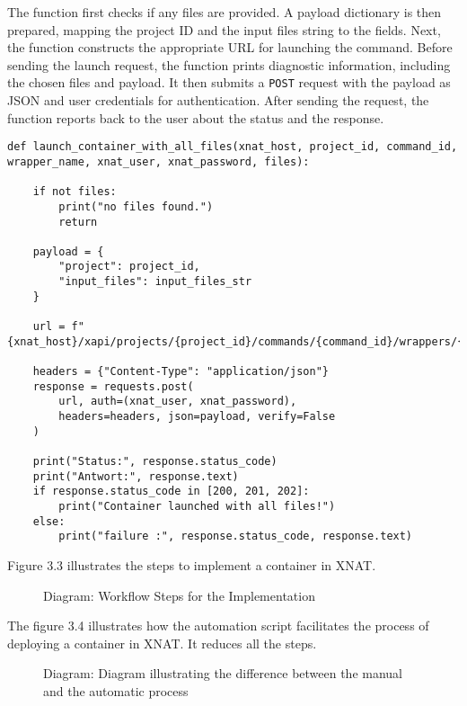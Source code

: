 The function first checks if any files are provided. A payload dictionary is then prepared, mapping the project ID and the input files string to the fields. Next, the function constructs the appropriate URL for launching the command. Before sending the launch request, the function prints diagnostic information, including the chosen files and payload. It then submits a \texttt{POST} request with the payload as JSON and user credentials for authentication. After sending the request, the function reports back to the user about the status and the response.

\begin{lstlisting}
def launch_container_with_all_files(xnat_host, project_id, command_id, wrapper_name, xnat_user, xnat_password, files):
   
    if not files:
        print("no files found.")
        return 

    payload = {
        "project": project_id,
        "input_files": input_files_str
    }

    url = f"{xnat_host}/xapi/projects/{project_id}/commands/{command_id}/wrappers/{wrapper_name}/root/project/launch"

    headers = {"Content-Type": "application/json"}
    response = requests.post(
        url, auth=(xnat_user, xnat_password),
        headers=headers, json=payload, verify=False
    )

    print("Status:", response.status_code)
    print("Antwort:", response.text)
    if response.status_code in [200, 201, 202]:
        print("Container launched with all files!")
    else:
        print("failure :", response.status_code, response.text)
\end{lstlisting}
Figure 3.3 illustrates the steps to implement a container in XNAT.


\begin{figure}[ht]
    \centering
    \def\svgwidth{0.9\linewidth}
    
    \caption{Diagram: Workflow Steps for the Implementation}
    \label{fig:workflow-steps}
\end{figure}


The figure 3.4 illustrates how the automation script facilitates the process of deploying a container in XNAT. It reduces all the steps.

\begin{figure}[ht]
    \centering
    \def\svgwidth{0.9\linewidth}
    
    \caption{Diagram: Diagram illustrating the difference between the manual and the automatic process}
    \label{fig:enter-label}
\end{figure}

\begin{comment}
    https://wiki.xnat.org/documentation/strategies-for-xnat-image-data-storage
\end{comment}




